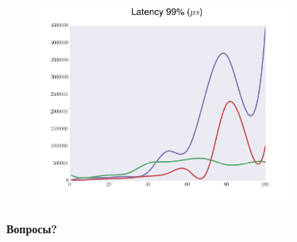 \documentclass[18pt, compress, aspectratio=169]{beamer}
\begin{document}
\begin{frame}
    \frametitle{}
    \begin{center}
    \begin{figure}
        \includegraphics[width=0.75\textwidth,center]{benchmarks/workload_a_large_document/latency_99.png}
    \end{figure}
    \end{center}
\end{frame}





\fontsize{25pt}{27}\selectfont
\begin{frame}
    \frametitle{}
    \begin{center}
    \textbf{Вопросы?}
    \end{center}
\end{frame}
\end{document}
